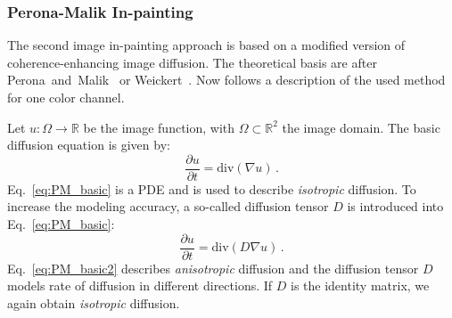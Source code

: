 \subsubsection{Perona-Malik In-painting}
\label{sssec:num412}
The second image in-painting approach is based on a modified version of coherence-enhancing image diffusion. The theoretical basis are after Perona~and~Malik~\cite{Perona90} or Weickert~\cite{weickert98}. Now follows a description of the used method for one color channel.

Let $u : \Omega \rightarrow \mathbb{R}$ be the image function, with $  \Omega \subset \mathbb{R}^2$ the image domain. The basic diffusion equation is given by: \begin{equation}\frac{\partial u}{\partial t}=\text{div}(\nabla u)\,.
\label{eq:PM_basic}
\end{equation}
Eq.~\eqref{eq:PM_basic} is a PDE and is used to describe \textit{isotropic} diffusion. To increase the modeling accuracy, a so-called diffusion tensor $D$ is introduced into Eq.~\eqref{eq:PM_basic}:
\begin{equation}
\frac{\partial u}{\partial t} = \text{div}(D\nabla u)\,.
\label{eq:PM_basic2}
\end{equation}
Eq.~\eqref{eq:PM_basic2} describes \textit{anisotropic} diffusion and the diffusion tensor $D$ models rate of diffusion in different directions. If $D$ is the identity matrix, we again obtain \textit{isotropic} diffusion. 

